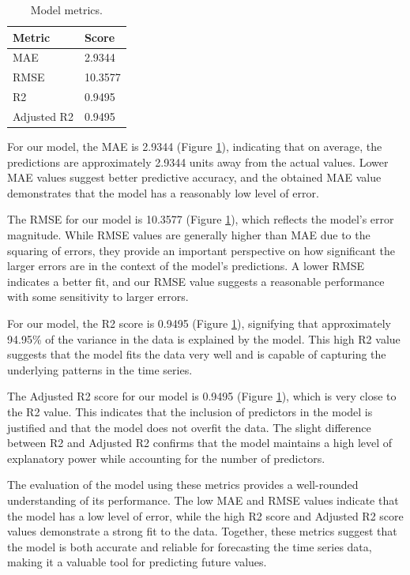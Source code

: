 \begin{table}[H]
  \centering
  \begin{tabular}{ll}
    \toprule
    \textbf{Metric} & \textbf{Score} \\ \midrule
    MAE             & 2.9344         \\ \midrule
    RMSE            & 10.3577        \\ \midrule
    R2              & 0.9495         \\ \midrule
    Adjusted R2     & 0.9495         \\ \bottomrule
  \end{tabular}
  \caption{Model metrics.}
  \label{table:model-metrics}
\end{table}

For our model, the MAE is 2.9344 (Figure \ref{table:model-metrics}), indicating
that on average, the predictions are approximately 2.9344 units away from the
actual values. Lower MAE values suggest better predictive accuracy, and the
obtained MAE value demonstrates that the model has a reasonably low level of error.

The RMSE for our model is 10.3577 (Figure \ref{table:model-metrics}),
which reflects the model's error magnitude.
While RMSE values are generally higher than MAE due to the squaring of errors,
they provide an important perspective on how significant the larger errors are
in the context of the model's predictions. A lower RMSE indicates a better fit,
and our RMSE value suggests a reasonable performance with some sensitivity to larger errors.

For our model, the R2 score is 0.9495 (Figure \ref{table:model-metrics}), signifying
that approximately 94.95\% of the variance in the data is explained by the model.
This high R2 value suggests that the model fits the data very well and is capable
of capturing the underlying patterns in the time series.

The Adjusted R2 score for our model is 0.9495 (Figure \ref{table:model-metrics}),
which is very close to the R2 value. This indicates that the inclusion of
predictors in the model is justified and that the model does not overfit the data.
The slight difference between R2 and Adjusted R2 confirms that the model maintains
a high level of explanatory power while accounting for the number of predictors.

The evaluation of the model using these metrics provides a well-rounded
understanding of its performance. The low \ac{MAE} and \ac{RMSE} values indicate
that the model has a low level of error, while the high R2 score and Adjusted
R2 score values demonstrate a strong fit to the data. Together, these metrics
suggest that the model is both accurate and reliable for forecasting the
time series data, making it a valuable tool for predicting future values.


